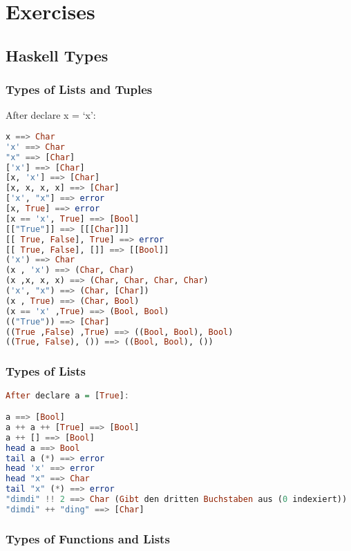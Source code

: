 \section{Exercises}

\hypertarget{haskell-types}{%
\subsection{Haskell Types}\label{haskell-types}}

\hypertarget{types-of-lists-and-tuples}{%
\subsubsection{Types of Lists and Tuples}\label{types-of-lists-and-tuples}}

After declare x = `x':

\begin{lstlisting}[language=Haskell]
x ==> Char
'x' ==> Char
"x" ==> [Char]
['x'] ==> [Char]
[x, 'x'] ==> [Char]
[x, x, x, x] ==> [Char]
['x', "x"] ==> error
[x, True] ==> error
[x == 'x', True] ==> [Bool]
[["True"]] ==> [[[Char]]]
[[ True, False], True] ==> error
[[ True, False], []] ==> [[Bool]]
('x') ==> Char
(x , 'x') ==> (Char, Char)
(x ,x, x, x) ==> (Char, Char, Char, Char)
('x', "x") ==> (Char, [Char])
(x , True) ==> (Char, Bool)
(x == 'x' ,True) ==> (Bool, Bool)
(("True")) ==> [Char]
((True ,False) ,True) ==> ((Bool, Bool), Bool)
((True, False), ()) ==> ((Bool, Bool), ())
\end{lstlisting}

\hypertarget{types-of-lists}{%
\subsubsection{Types of Lists}\label{types-of-lists}}

\begin{lstlisting}[language=Haskell]
After declare a = [True]:

a ==> [Bool]
a ++ a ++ [True] ==> [Bool]
a ++ [] ==> [Bool]
head a ==> Bool
tail a (*) ==> error
head 'x' ==> error
head "x" ==> Char
tail "x" (*) ==> error
"dimdi" !! 2 ==> Char (Gibt den dritten Buchstaben aus (0 indexiert))
"dimdi" ++ "ding" ==> [Char]
\end{lstlisting}

\hypertarget{types-of-functions-and-lists}{%
\subsubsection{Types of Functions and
Lists}\label{types-of-functions-and-lists}}

